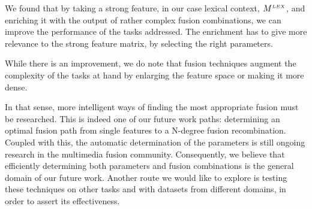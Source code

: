 We found that by taking a strong feature, in our case lexical context, $M^{\scriptscriptstyle LEX}$, and enriching it with the output of rather complex fusion combinations, we can improve the performance of the tasks addressed. The enrichment has to give more relevance to the strong feature matrix, by selecting the right parameters. 

While there is an improvement, we do note that fusion techniques augment the complexity of the tasks at hand by enlarging the feature space or making it more dense.

In that sense, more intelligent ways of finding the most appropriate fusion must be researched. This is indeed one of our future work paths: determining an optimal fusion path from single features to a N-degree fusion recombination. Coupled with this, the automatic determination of the parameters is still ongoing research in the multimedia fusion community. Consequently, we believe that efficiently determining both parameters and fusion combinations is the general domain of our future work. Another route we would like to explore is testing these techniques on other tasks and with datasets from different domains, in order to assert its effectiveness.

